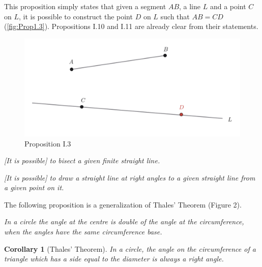 \documentclass{article}
\theoremstyle{plain}
\newtheorem*{corollary}{Corollary}
\theoremstyle{definition}
\newenvironment{customthm}[1]
  {\renewcommand\theinnercustomthm{#1}\innercustomthm}
  {\endinnercustomthm}
\begin{document}
This proposition simply states that given a segment $AB$, a line $L$ and a point $C$ on $L$, it is possible to construct the point $D$ on $L$ such that $AB = CD$ (\autoref*{fig:Prop1.3}). Propositions I.10 and I.11 are already clear from their statements.

\begin{figure}[h!]
    \centering
    \includegraphics[scale=0.35]{pics/Prop1.3.png}
    \caption{Proposition I.3}
    \label{fig:Prop1.3}
\end{figure}

\begin{customthm}{I.10}\label{1.10}
    \textit{[It is possible] to bisect a given finite straight line.}
\end{customthm}

\begin{customthm}{I.11}\label{1.11}
    \textit{[It is possible] to draw a straight line at right angles to a given straight line from a given point on it.}
\end{customthm}

The following proposition is a generalization of Thales' Theorem (Figure 2).

\begin{customthm}{III.20}\label{3.20}
    \textit{In a circle the angle at the centre is double of the angle at the circumference, when the angles have the same circumference base.}
\end{customthm}

\begin{corollary}[Thales' Theorem]
    In a circle, the angle on the circumference of a triangle which has a side equal to the diameter is always a right angle.
\end{corollary}
\end{document}
